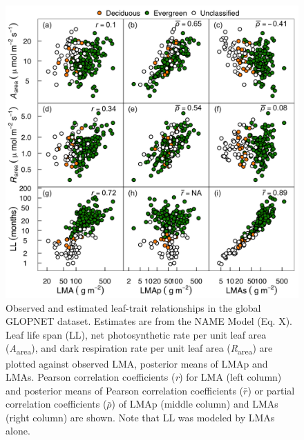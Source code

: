 \documentclass[
  12pt,
]{article}
\begin{document}
\begin{figure}
\hypertarget{fig:GLplt}{%
\centering
\includegraphics{../figs/GL_scatter.png}
\caption{Observed and estimated leaf-trait relationships in the global GLOPNET dataset.
Estimates are from the NAME Model (Eq. X).
Leaf life span (LL), net photosynthetic rate per unit leaf area (\emph{A}\textsubscript{area}), and dark respiration rate per unit leaf area (\emph{R}\textsubscript{area}) are plotted against observed LMA, posterior means of LMAp and LMAs.
Pearson correlation coefficients (\emph{r}) for LMA (left column) and posterior means of Pearson correlation coefficients (\(\bar{r}\)) or partial correlation coefficients (\(\bar{\rho}\)) of LMAp (middle column) and LMAs (right column) are shown.
Note that LL was modeled by LMAs alone.}\label{fig:GLplt}
}
\end{figure}

\newpage
\end{document}
